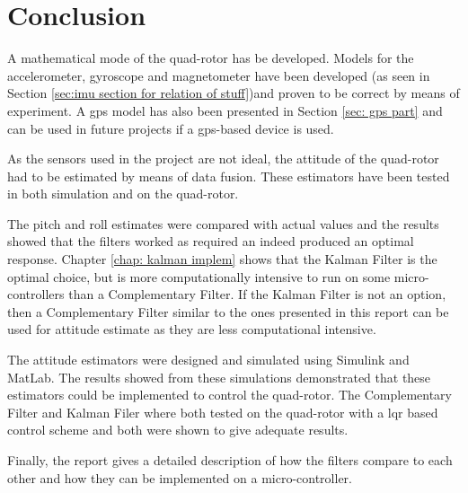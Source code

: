 \chapter{Conclusion}

A mathematical mode of the quad-rotor has be developed. Models for the accelerometer, gyroscope and magnetometer have been developed (as seen in  Section \ref{sec:imu section for relation of stuff})and proven to be correct by means of experiment. A \gls{gps} model has also been presented in Section \ref{sec: gps part} and can be used in future projects if a \gls{gps}-based device is used.


As the sensors used in the project are not ideal, the attitude of the quad-rotor had to be estimated by means of data fusion. These estimators have been tested in both simulation and on the quad-rotor.

The pitch and roll estimates were compared with actual values and the results showed that the filters worked as required an indeed produced an optimal response. Chapter \ref{chap: kalman implem} shows that the Kalman Filter is the optimal choice, but is more computationally intensive to run on some micro-controllers than a Complementary Filter. If the Kalman Filter is not an option, then a Complementary Filter similar to the ones presented in this report can be used for attitude estimate as they are less computational intensive.


The attitude estimators were designed and simulated using Simulink and MatLab. The results showed from these simulations demonstrated that these estimators could be implemented to control the quad-rotor. The Complementary Filter and Kalman Filer where both tested on the quad-rotor with a \gls{lqr} based control scheme and both were shown to give adequate  results.

Finally, the report gives a detailed description of how the filters compare to each other and how they can be implemented on a micro-controller. 


